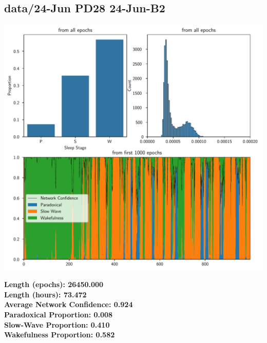         \subsection*{ data/24-Jun PD28 24-Jun-B2 }
        \begin{center}
        \begin{adjustbox}{width=1\textwidth}
        \includegraphics[page=11]{figs.pdf}
        \end{adjustbox}
        \end{center}
        \large\textbf{Length (epochs): 26450.000}\\
        \textbf{Length (hours): 73.472}\\
        \textbf{Average Network Confidence: 0.924}\\
        \textbf{Paradoxical Proportion: 0.008}\\
        \textbf{Slow-Wave Proportion: 0.410}\\
        \textbf{Wakefulness Proportion: 0.582}\\
        
